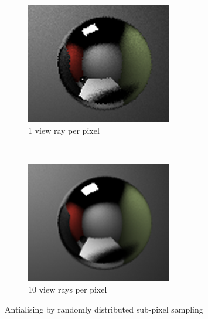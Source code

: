 \documentclass[]{report}   %
\begin{document}
\begin{figure}
        \centering
        \begin{subfigure}[b]{0.3\textwidth}
                \includegraphics[width=\textwidth]{figures/aliasing_1.png}
                \caption{1 view ray per pixel}
                \label{fig:gull}
        \end{subfigure}%
        ~ %
        \begin{subfigure}[b]{0.3\textwidth}
                \includegraphics[width=\textwidth]{figures/aliasing_10.png}
                \caption{10 view rays per pixel}
                \label{fig:tiger}
        \end{subfigure}
        \caption{Antialising by randomly distributed sub-pixel sampling}\label{fig:antialiasing}
\end{figure}
\end{document}
